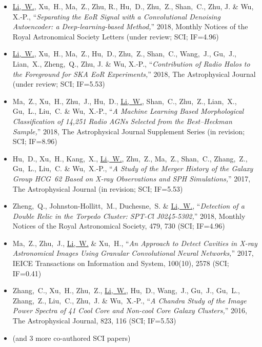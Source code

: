 \documentclass{resume}
\begin{document}
\begin{itemize}
  \small
  \item \uline{Li,~W.}, Xu,~H., Ma,~Z., Zhu, R., Hu,~D., Zhu,~Z.,
    Shan,~C., Zhu, J. \& Wu, X.-P.,
    \enquote{\it Separating the EoR Signal with a Convolutional Denoising
      Autoencoder: a Deep-learning-based Method,}
    2018, Monthly Notices of the Royal Astronomical Society Letters
    (under review; SCI; IF=4.96)
  \item \uline{Li,~W.}, Xu,~H., Ma,~Z., Hu,~D., Zhu,~Z., Shan,~C.,
    Wang,~J., Gu,~J., Lian,~X., Zheng,~Q., Zhu, J. \& Wu, X.-P.,
    \enquote{\it Contribution of Radio Halos to the Foreground for
      SKA EoR Experiments,}
    2018, The Astrophysical Journal (under review; SCI; IF=5.53)
  \item Ma,~Z., Xu,~H., Zhu,~J., Hu,~D., \uline{Li,~W.}, Shan,~C., Zhu,~Z.,
    Lian,~X., Gu,~L., Liu,~C. \& Wu,~X.-P.,
    \enquote{\it A Machine Learning Based Morphological Classification
      of 14,251 Radio AGNs Selected from the Best--Heckman Sample,}
    2018, The Astrophysical Journal Supplement Series
    (in revision; SCI; IF=8.96)
  \item Hu,~D., Xu,~H., Kang,~X., \uline{Li,~W.}, Zhu,~Z., Ma,~Z.,
    Shan,~C., Zhang,~Z., Gu,~L., Liu,~C. \& Wu,~X.-P.,
    \enquote{\it A Study of the Merger History of the Galaxy Group
      HCG~62 Based on X-ray Observations and SPH Simulations,}
    2017, The Astrophysical Journal
    (in revision; SCI; IF=5.53)
  \item Zheng,~Q., Johnston-Hollitt,~M., Duchesne,~S. \& \uline{Li,~W.},
    \enquote{\it Detection of a Double Relic in the Torpedo Cluster:
      SPT-Cl J0245-5302,}
    2018, Monthly Notices of the Royal Astronomical Society, 479, 730
    (SCI; IF=4.96)
  \item Ma,~Z., Zhu,~J., \uline{Li,~W.} \& Xu,~H.,
    \enquote{\it An Approach to Detect Cavities in X-ray Astronomical
      Images Using Granular Convolutional Neural Networks,}
    2017, IEICE Transactions on Information and System, 100(10), 2578
    (SCI; IF=0.41)
  \item Zhang,~C., Xu,~H., Zhu,~Z., \uline{Li,~W.}, Hu,~D., Wang,~J.,
    Gu,~J., Gu,~L., Zhang,~Z., Liu,~C., Zhu,~J. \& Wu,~X.-P.,
    \enquote{\it A Chandra Study of the Image Power Spectra of 41
      Cool Core and Non-cool Core Galaxy Clusters,}
    2016, The Astrophysical Journal, 823, 116 (SCI; IF=5.53)
  \item (and 3 more co-authored SCI papers)
\end{itemize}
\end{document}
